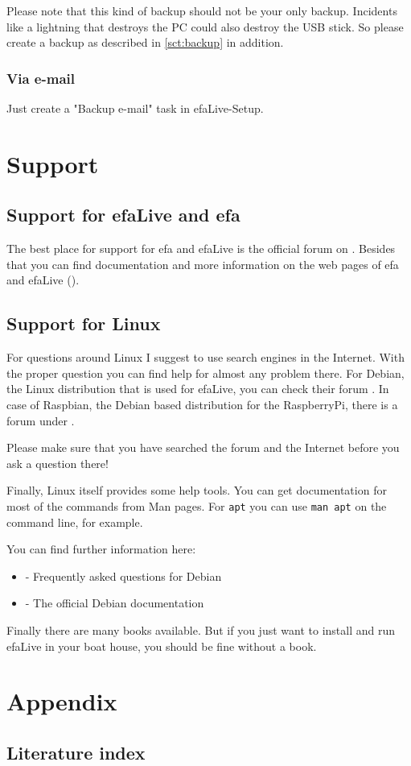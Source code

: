 \documentclass[a4paper,12pt,twoside]{article}
\begin{document}
Please note that this kind of backup should not be your only backup.
Incidents like a lightning that destroys the PC could also destroy the
USB stick. So please create a backup as described in \ref{sct:backup} in addition.

\subsubsection{Via e-mail}
\label{sct:cont_mail}
Just create a "Backup e-mail" task in efaLive-Setup.


\section{Support}
\label{sct:support}
\subsection{Support for efaLive and efa}
\label{sct:support_efa}
The best place for support for efa and efaLive is the official forum on
\cite{EFA3}. Besides that you can find documentation and more
information on the web pages of efa and efaLive
(\cite{EFA1}\cite{EFA4}\cite{EFA5}).


\subsection{Support for Linux}
\label{support_linux}
For questions around Linux I suggest to use search engines in the
Internet. With the proper question you can find help for almost any
problem there. For Debian, the Linux distribution that is used for
efaLive, you can check their forum \cite{HLP1}. In case of Raspbian, 
the Debian based distribution for the RaspberryPi, there is a forum 
under \cite{RSP1}.

Please make sure that
you have searched the forum and the Internet before you ask a question
there!

Finally, Linux itself provides some help tools. You can get
documentation for most of the commands from Man pages. For
\texttt{apt} you can use \texttt{man
apt} on the command line, for example.

You can find further information here:

\begin{itemize}
    \item \cite{HLP2} - Frequently asked questions for Debian
    \item \cite{HLP3} - The official Debian documentation
\end{itemize}

Finally there are many books available. But if you just want to install
and run efaLive in your boat house, you should be fine without a book.


\clearpage
\section{Appendix}
\label{sct:appendix}
\subsection{Literature index}
\label{sct:literature}


\end{document}
